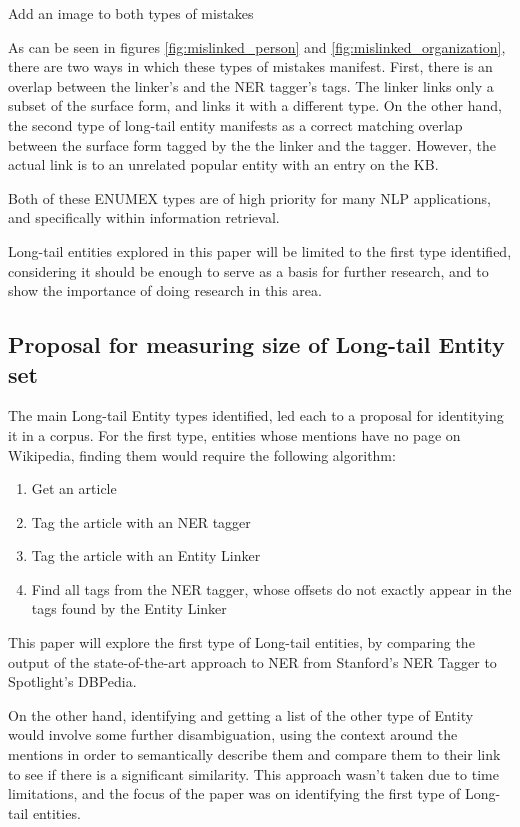 \todo Add an image to both types of mistakes

As can be seen in figures \ref{fig:mislinked_person} and \ref{fig:mislinked_organization}, there are two ways in which these types of mistakes manifest.
First, there is an overlap between the linker's and the NER tagger's tags. The linker links only a subset of the surface form, and links it with a different type.
On the other hand, the second type of long-tail entity manifests as a correct matching overlap between the surface form tagged by the the linker and the tagger.
However, the actual link is to an unrelated popular entity with an entry on the KB. 

Both of these ENUMEX types are of high priority for many NLP applications, and specifically within information retrieval. 

Long-tail entities explored in this paper will be limited to the first type identified, considering it should be enough to serve as a basis for further research,
and to show the importance of doing research in this area. 


\subsection{Proposal for measuring size of Long-tail Entity set}
The main Long-tail Entity types identified, led each to a proposal for identitying it in a corpus. 
For the first type, entities whose mentions have no page on Wikipedia, finding them would require the following algorithm:
\
\begin{enumerate}
\item Get an article
\item Tag the article with an NER tagger
\item Tag the article with an Entity Linker
\item Find all tags from the NER tagger, whose offsets do not exactly appear in the tags found by the Entity Linker
\end{enumerate}
This paper will explore the first type of Long-tail entities, by comparing the output of the state-of-the-art approach to NER from Stanford's NER Tagger
to Spotlight's DBPedia.

On the other hand, identifying and getting a list of the other type of Entity would involve some further disambiguation,
using the context around the mentions in order to semantically describe them and compare them to their link to see if there is a significant similarity.
This approach wasn't taken due to time limitations, and the focus of the paper was on identifying the first type of Long-tail entities.

